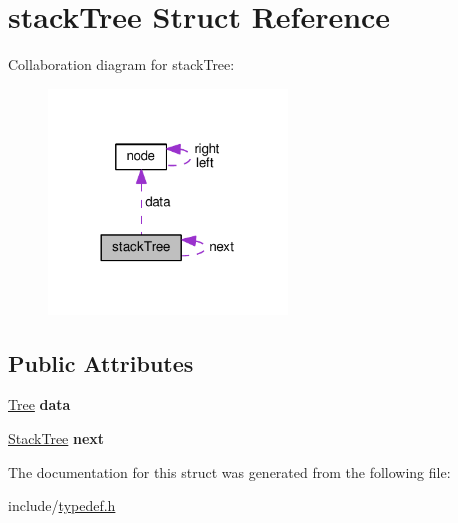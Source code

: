 \hypertarget{structstackTree}{}\section{stack\+Tree Struct Reference}
\label{structstackTree}


Collaboration diagram for stack\+Tree\+:
\nopagebreak
\begin{figure}[H]
\begin{center}
\leavevmode
\includegraphics[width=180pt]{structstackTree__coll__graph}
\end{center}
\end{figure}
\subsection*{Public Attributes}
\begin{DoxyCompactItemize}
\item 
\hyperlink{structnode}{Tree} {\bfseries data}\hypertarget{structstackTree_a0948f3bec59d376fcb496088ef1eb390}{}\label{structstackTree_a0948f3bec59d376fcb496088ef1eb390}

\item 
\hyperlink{structstackTree}{Stack\+Tree} {\bfseries next}\hypertarget{structstackTree_ab01d5af00bf143c04cdb6c03ff3b4fb5}{}\label{structstackTree_ab01d5af00bf143c04cdb6c03ff3b4fb5}

\end{DoxyCompactItemize}


The documentation for this struct was generated from the following file\+:\begin{DoxyCompactItemize}
\item 
include/\hyperlink{typedef_8h}{typedef.\+h}\end{DoxyCompactItemize}
